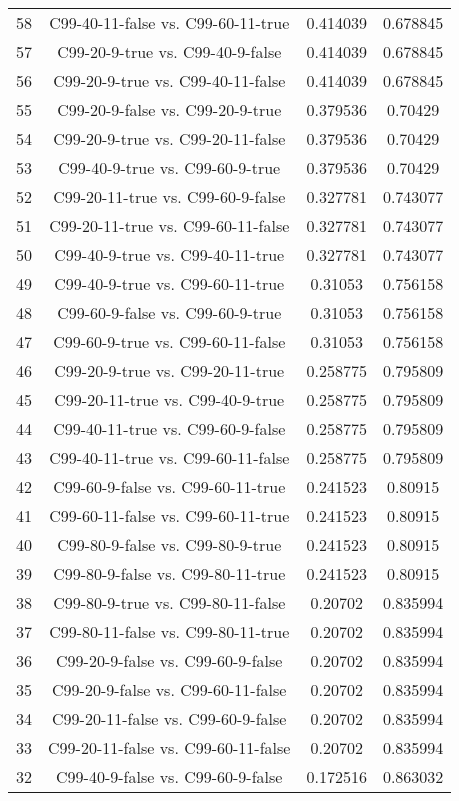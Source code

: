 \documentclass[a4paper,10pt]{article}
\begin{document}
\begin{landscape}
\begin{table}[!htp]
\begin{tabular}{cccc}
58&C99-40-11-false vs. C99-60-11-true&0.414039&0.678845\\
57&C99-20-9-true vs. C99-40-9-false&0.414039&0.678845\\
56&C99-20-9-true vs. C99-40-11-false&0.414039&0.678845\\
55&C99-20-9-false vs. C99-20-9-true&0.379536&0.70429\\
54&C99-20-9-true vs. C99-20-11-false&0.379536&0.70429\\
53&C99-40-9-true vs. C99-60-9-true&0.379536&0.70429\\
52&C99-20-11-true vs. C99-60-9-false&0.327781&0.743077\\
51&C99-20-11-true vs. C99-60-11-false&0.327781&0.743077\\
50&C99-40-9-true vs. C99-40-11-true&0.327781&0.743077\\
49&C99-40-9-true vs. C99-60-11-true&0.31053&0.756158\\
48&C99-60-9-false vs. C99-60-9-true&0.31053&0.756158\\
47&C99-60-9-true vs. C99-60-11-false&0.31053&0.756158\\
46&C99-20-9-true vs. C99-20-11-true&0.258775&0.795809\\
45&C99-20-11-true vs. C99-40-9-true&0.258775&0.795809\\
44&C99-40-11-true vs. C99-60-9-false&0.258775&0.795809\\
43&C99-40-11-true vs. C99-60-11-false&0.258775&0.795809\\
42&C99-60-9-false vs. C99-60-11-true&0.241523&0.80915\\
41&C99-60-11-false vs. C99-60-11-true&0.241523&0.80915\\
40&C99-80-9-false vs. C99-80-9-true&0.241523&0.80915\\
39&C99-80-9-false vs. C99-80-11-true&0.241523&0.80915\\
38&C99-80-9-true vs. C99-80-11-false&0.20702&0.835994\\
37&C99-80-11-false vs. C99-80-11-true&0.20702&0.835994\\
36&C99-20-9-false vs. C99-60-9-false&0.20702&0.835994\\
35&C99-20-9-false vs. C99-60-11-false&0.20702&0.835994\\
34&C99-20-11-false vs. C99-60-9-false&0.20702&0.835994\\
33&C99-20-11-false vs. C99-60-11-false&0.20702&0.835994\\
32&C99-40-9-false vs. C99-60-9-false&0.172516&0.863032\\

\end{tabular}
\end{table}
\end{landscape}
\end{document}
